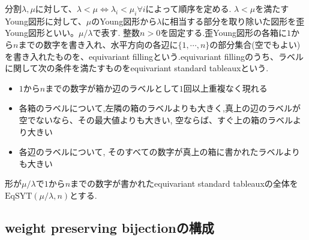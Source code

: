 \begin{defin}
  分割$\lambda, \mu$に対して、$\lambda<\mu\Leftrightarrow \lambda_i<\mu_i \forall i$によって順序を定める. $\lambda<\mu$を満たすYoung図形に対して、$\mu$のYoung図形から$\lambda$に相当する部分を取り除いた図形を歪Young図形といい。$\mu/\lambda$で表す. 整数$n>0$を固定する.歪Young図形の各箱に$1$から$n$までの数字を書き入れ、水平方向の各辺に$\{1,\cdots,n\}$の部分集合(空でもよい)を書き入れたものを、equivariant fillingという.equivariant fillingのうち、ラベルに関して次の条件を満たすものをequivariant standard tableauxという.
  \begin{itemize}
    \item $1$から$n$までの数字が箱か辺のラベルとして$1$回以上重複なく現れる
    \item 各箱のラベルについて,左隣の箱のラベルよりも大きく,真上の辺のラベルが空でないなら、その最大値よりも大きい, 空ならば、すぐ上の箱のラベルより大きい
    \item 各辺のラベルについて, そのすべての数字が真上の箱に書かれたラベルよりも大きい
  \end{itemize}
  形が$\mu/\lambda$で$1$から$n$までの数字が書かれたequivariant standard tableauxの全体を$\text{EqSYT}(\mu/\lambda, n)$とする.
\end{defin}

\begin{defin}
  
\end{defin}






\subsection{weight preserving bijectionの構成}